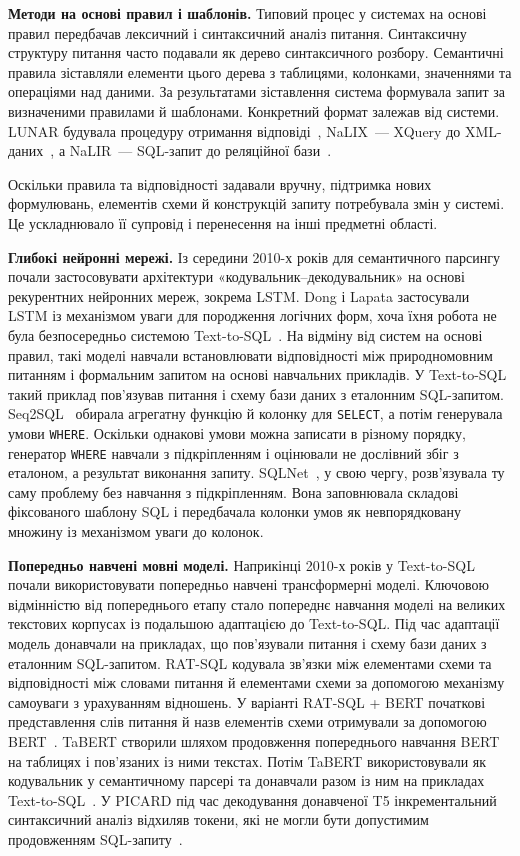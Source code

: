 \documentclass[a4paper,14pt,oneside]{extreport}
\begin{document}
\textbf{Методи на основі правил і шаблонів.}
Типовий процес у системах на основі правил передбачав лексичний і синтаксичний аналіз питання. Синтаксичну структуру питання часто подавали як дерево синтаксичного розбору. Семантичні правила зіставляли елементи цього дерева з таблицями, колонками, значеннями та операціями над даними. За результатами зіставлення система формувала запит за визначеними правилами й шаблонами. Конкретний формат залежав від системи. LUNAR будувала процедуру отримання відповіді~\cite{woods1972lunar}, NaLIX~--- XQuery до XML-даних~\cite{li2005nalix}, а NaLIR~--- SQL-запит до реляційної бази~\cite{li2014nalir}.

Оскільки правила та відповідності задавали вручну, підтримка нових формулювань, елементів схеми й конструкцій запиту потребувала змін у системі. Це ускладнювало її супровід і перенесення на інші предметні області.

\textbf{Глибокі нейронні мережі.}
Із середини 2010-х років для семантичного парсингу почали застосовувати архітектури «кодувальник–декодувальник» на основі рекурентних нейронних мереж, зокрема LSTM. Dong і Lapata застосували LSTM із механізмом уваги для породження логічних форм, хоча їхня робота не була безпосередньо системою Text-to-SQL~\cite{dong2016logical}. На відміну від систем на основі правил, такі моделі навчали встановлювати відповідності між природномовним питанням і формальним запитом на основі навчальних прикладів. У Text-to-SQL такий приклад пов’язував питання і схему бази даних з еталонним SQL-запитом. Seq2SQL~\cite{zhong2017seq2sql} обирала агрегатну функцію й колонку для \texttt{SELECT}, а потім генерувала умови \texttt{WHERE}. Оскільки однакові умови можна записати в різному порядку, генератор \texttt{WHERE} навчали з підкріпленням і оцінювали не дослівний збіг з еталоном, а результат виконання запиту. SQLNet~\cite{xu2017sqlnet}, у свою чергу, розв’язувала ту саму проблему без навчання з підкріпленням. Вона заповнювала складові фіксованого шаблону SQL і передбачала колонки умов як невпорядковану множину із механізмом уваги до колонок.

\textbf{Попередньо навчені мовні моделі.}
Наприкінці 2010-х років у Text-to-SQL почали використовувати попередньо навчені трансформерні моделі. Ключовою відмінністю від попереднього етапу стало попереднє навчання моделі на великих текстових корпусах із подальшою адаптацією до Text-to-SQL. Під час адаптації модель донавчали на прикладах, що пов’язували питання і схему бази даних з еталонним SQL-запитом. RAT-SQL кодувала зв’язки між елементами схеми та відповідності між словами питання й елементами схеми за допомогою механізму самоуваги з урахуванням відношень. У варіанті RAT-SQL + BERT початкові представлення слів питання й назв елементів схеми отримували за допомогою BERT~\cite{wang2020ratsql}. TaBERT створили шляхом продовження попереднього навчання BERT на таблицях і пов’язаних із ними текстах. Потім TaBERT використовували як кодувальник у семантичному парсері та донавчали разом із ним на прикладах Text-to-SQL~\cite{yin2020tabert}. У PICARD під час декодування донавченої T5 інкрементальний синтаксичний аналіз відхиляв токени, які не могли бути допустимим продовженням SQL-запиту~\cite{scholak2021picard}.
\end{document}
